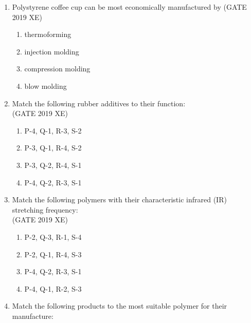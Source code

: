 \documentclass[journal,12pt,onecolumn]{IEEEtran}
\begin{document}
\begin{enumerate}
\item Polystyrene coffee cup can be most economically manufactured by
\hfill{(GATE 2019 XE)} \\
\begin{multicols}{2}
\begin{enumerate}
\item thermoforming
\item injection molding
\item compression molding
\item blow molding
\end{enumerate}
\end{multicols}


\item Match the following rubber additives to their function:\\



\hfill{(GATE 2019 XE)} \\
\begin{multicols}{2}
\begin{enumerate}
\item P-4, Q-1, R-3, S-2
\item P-3, Q-1, R-4, S-2
\item P-3, Q-2, R-4, S-1
\item P-4, Q-2, R-3, S-1
\end{enumerate}
\end{multicols}

\item Match the following polymers with their characteristic infrared (IR) stretching frequency:\\



\hfill{(GATE 2019 XE)} \\
\begin{multicols}{2}
\begin{enumerate}
\item P-2, Q-3, R-1, S-4
\item P-2, Q-1, R-4, S-3
\item P-4, Q-2, R-3, S-1
\item P-4, Q-1, R-2, S-3
\end{enumerate}
\end{multicols}

\newpage

\item Match the following products to the most suitable polymer for their manufacture:\\


\end{enumerate}
\end{document}
